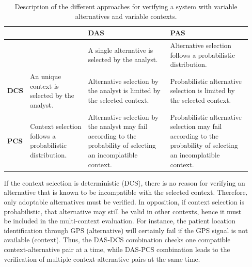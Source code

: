 \begin{table}[h]\label{tab:DAS_PAS_DCS_PCS}
{\renewcommand{\arraystretch}{1.5}
\begin{tabularx}{\textwidth}{@{}l|XXX@{}}
\toprule
             &                                                         & \textbf{DAS}                                                                                                      & \textbf{PAS}                                                                                                     \\ \midrule
             &                                                         & A single alternative is selected by the analyst.                                                                  & Alternative selection follows a probabilistic distribution.                                                      \\
\textbf{DCS} & An unique context is selected by the analyst.           & Alternative selection by the analyst is limited by the selected context.                                          & Probabilistic alternative selection is limited by the selected context.                                          \\
\textbf{PCS} & Context selection follows a probabilistic distribution. & Alternative selection by the analyst may fail according to the probability of selecting an incomplatible context. & Probabilistic alternative selection may fail according to the probability of selecting an incomplatible context. \\ \bottomrule
\end{tabularx}
}
\caption{Description of the different approaches for verifying a system with variable alternatives and variable contexts.}
\end{table}

If the context selection is deterministic (DCS), there is no reason for verifying an alternative that is known to be incompatible with the selected context. Therefore, only adoptable alternatives must be verified. In opposition, if context selection is probabilistic, that alternative may still be valid in other contexts, hence it must be included in the multi-context evaluation. For instance, the patient location identification through GPS (alternative) will certainly fail if the GPS signal is not available (context). Thus, the DAS-DCS combination checks one compatible context-alternative pair at a time, while DAS-PCS combination leads to the verification of multiple context-alternative pairs at the same time.

